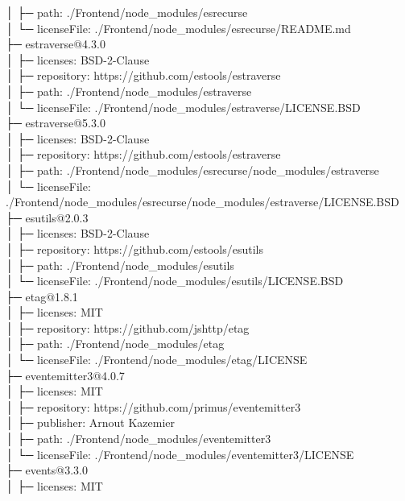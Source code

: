 \documentclass[
    paper=a4,
    twoside=false,
    parskip=half,
    listof=entryprefix,
    listof=totoc,
    index=totoc,
    bibliography=totoc,
    headsepline,
]{scrbook}
\begin{document}
    │  ├─ path: ./Frontend/node\_modules/esrecurse\\
    │  └─ licenseFile: ./Frontend/node\_modules/esrecurse/README.md\\
    ├─ estraverse@4.3.0\\
    │  ├─ licenses: BSD-2-Clause\\
    │  ├─ repository: https://github.com/estools/estraverse\\
    │  ├─ path: ./Frontend/node\_modules/estraverse\\
    │  └─ licenseFile: ./Frontend/node\_modules/estraverse/LICENSE.BSD\\
    ├─ estraverse@5.3.0\\
    │  ├─ licenses: BSD-2-Clause\\
    │  ├─ repository: https://github.com/estools/estraverse\\
    │  ├─ path: ./Frontend/node\_modules/esrecurse/node\_modules/estraverse\\
    │  └─ licenseFile: ./Frontend/node\_modules/esrecurse/node\_modules/estraverse/LICENSE.BSD\\
    ├─ esutils@2.0.3\\
    │  ├─ licenses: BSD-2-Clause\\
    │  ├─ repository: https://github.com/estools/esutils\\
    │  ├─ path: ./Frontend/node\_modules/esutils\\
    │  └─ licenseFile: ./Frontend/node\_modules/esutils/LICENSE.BSD\\
    ├─ etag@1.8.1\\
    │  ├─ licenses: MIT\\
    │  ├─ repository: https://github.com/jshttp/etag\\
    │  ├─ path: ./Frontend/node\_modules/etag\\
    │  └─ licenseFile: ./Frontend/node\_modules/etag/LICENSE\\
    ├─ eventemitter3@4.0.7\\
    │  ├─ licenses: MIT\\
    │  ├─ repository: https://github.com/primus/eventemitter3\\
    │  ├─ publisher: Arnout Kazemier\\
    │  ├─ path: ./Frontend/node\_modules/eventemitter3\\
    │  └─ licenseFile: ./Frontend/node\_modules/eventemitter3/LICENSE\\
    ├─ events@3.3.0\\
    │  ├─ licenses: MIT\\
\end{document}
